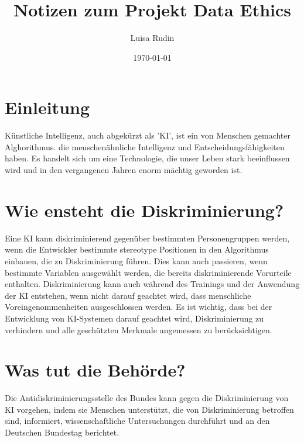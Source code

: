\documentclass{article}
\title{Notizen zum Projekt Data Ethics}
\author{Luisa Rudin}
\date{\today}
\begin{document}
\maketitle


\tableofcontents

\section{Einleitung}
Künstliche Intelligenz, auch abgekürzt als 'KI', ist ein von Menschen gemachter Alghorithmus.  die menschenähnliche Intelligenz und Entscheidungsfähigkeiten haben. Es handelt sich um eine Technologie, die unser Leben stark beeinflussen wird und in den vergangenen Jahren enorm mächtig geworden ist.

\section{Wie ensteht die Diskriminierung?}
Eine KI kann diskriminierend gegenüber bestimmten Personengruppen werden, wenn die Entwickler bestimmte stereotype Positionen in den Algorithmus einbauen, die zu Diskriminierung führen. Dies kann auch passieren, wenn bestimmte Variablen ausgewählt werden, die bereits diskriminierende Vorurteile enthalten. Diskriminierung kann auch während des Trainings und der Anwendung der KI entstehen, wenn nicht darauf geachtet wird, dass menschliche Voreingenommenheiten ausgeschlossen werden. Es ist wichtig, dass bei der Entwicklung von KI-Systemen darauf geachtet wird, Diskriminierung zu verhindern und alle geschützten Merkmale angemessen zu berücksichtigen.


\section{Was tut die Behörde?}
Die Antidiskriminierungsstelle des Bundes kann gegen die Diskriminierung von KI vorgehen, indem sie Menschen unterstützt, die von Diskriminierung betroffen sind, informiert, wissenschaftliche Untersuchungen durchführt und an den Deutschen Bundestag berichtet.
\end{document}
